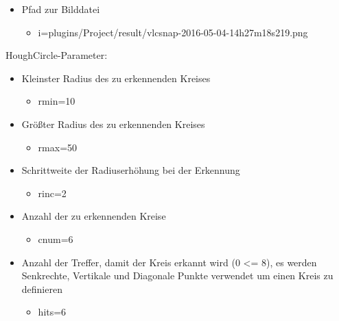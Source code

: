 \begin{itemize}
	\item Pfad zur Bilddatei
	\begin{itemize}
		\item i=plugins/Project/result/vlcsnap-2016-05-04-14h27m18s219.png
	\end{itemize}
	\end{itemize}
HoughCircle-Parameter:
\begin{itemize}
	\item Kleinster Radius des zu erkennenden Kreises
	\begin{itemize}
		 \item rmin=10
	\end{itemize}
	\item Größter Radius des zu erkennenden Kreises
	\begin{itemize}
		\item rmax=50
	\end{itemize}
	\item Schrittweite der Radiuserhöhung bei der Erkennung
	\begin{itemize}
		\item rinc=2
	\end{itemize}
	\item Anzahl der zu erkennenden Kreise
	\begin{itemize}
		\item cnum=6
	\end{itemize}
	\item Anzahl der Treffer, damit der Kreis erkannt wird (0 <= 8), es werden Senkrechte, Vertikale und Diagonale Punkte verwendet um einen Kreis zu definieren
	\begin{itemize}
		\item hits=6
	\end{itemize}
\end{itemize}
